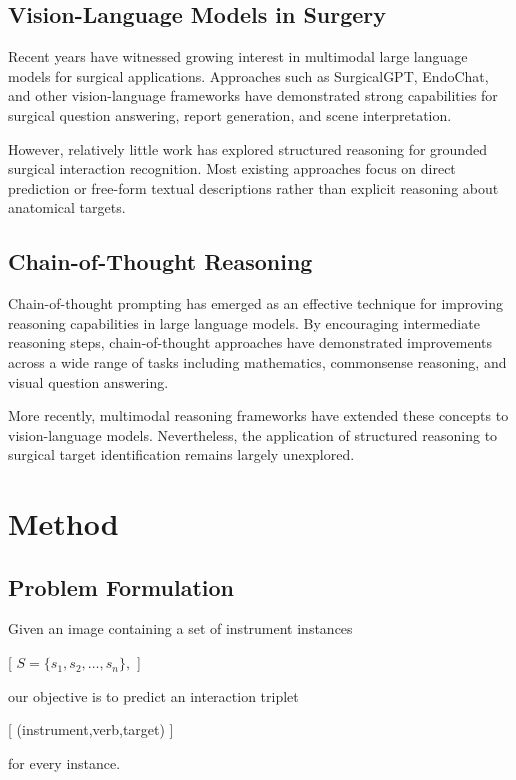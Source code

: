 \documentclass[11pt]{article}
\begin{document}
\subsection{Vision-Language Models in Surgery}

Recent years have witnessed growing interest in multimodal large language models for surgical applications. Approaches such as SurgicalGPT, EndoChat, and other vision-language frameworks have demonstrated strong capabilities for surgical question answering, report generation, and scene interpretation.

However, relatively little work has explored structured reasoning for grounded surgical interaction recognition. Most existing approaches focus on direct prediction or free-form textual descriptions rather than explicit reasoning about anatomical targets.

\subsection{Chain-of-Thought Reasoning}

Chain-of-thought prompting has emerged as an effective technique for improving reasoning capabilities in large language models. By encouraging intermediate reasoning steps, chain-of-thought approaches have demonstrated improvements across a wide range of tasks including mathematics, commonsense reasoning, and visual question answering.

More recently, multimodal reasoning frameworks have extended these concepts to vision-language models. Nevertheless, the application of structured reasoning to surgical target identification remains largely unexplored.

\section{Method}

\subsection{Problem Formulation}

Given an image containing a set of instrument instances

[
$S=\{s_1,s_2,\ldots,s_n\},$
]

our objective is to predict an interaction triplet

[
(instrument,verb,target)
]

for every instance.
\end{document}
